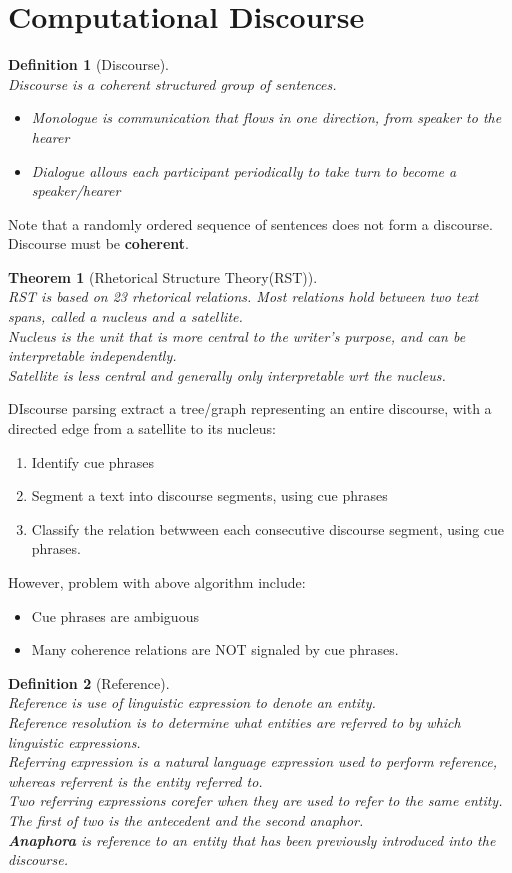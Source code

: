 \documentclass[12pt]{article}
\newtheorem{definition}{Definition}[section]
\newtheorem{theorem}{Theorem}[section]
\theoremstyle{definition}
\begin{document}
\section{Computational Discourse}
\begin{definition}[Discourse]
\hfill\\\normalfont Discourse is a coherent structured group of sentences.
\begin{itemize}
	\item Monologue is communication that flows in one direction, from speaker to the hearer
	\item Dialogue allows each participant periodically to take turn to become a speaker/hearer
\end{itemize}
\end{definition}
Note that a randomly ordered sequence of sentences does not form a discourse. Discourse must be \textbf{coherent}.
\begin{theorem}[Rhetorical Structure Theory(RST)]
\hfill\\\normalfont RST is based on 23 rhetorical relations. Most relations hold between two text spans, called a \textit{nucleus} and a \textit{satellite}.\\
Nucleus is the unit that is more central to the writer's purpose, and can be interpretable independently.\\
Satellite is less central and generally only interpretable wrt the nucleus.
\end{theorem}
DIscourse parsing extract a tree/graph representing an entire discourse, with a directed edge from a satellite to its nucleus:
\begin{enumerate}
	\item Identify cue phrases
	\item Segment a text into discourse segments, using cue phrases
	\item Classify the relation betwween each consecutive discourse segment, using cue phrases.
\end{enumerate}
However, problem with above algorithm include:
\begin{itemize}
	\item Cue phrases are ambiguous
	\item Many coherence relations are NOT signaled by cue phrases.
\end{itemize}
\begin{definition}[Reference]
\hfill\\\normalfont Reference is use of linguistic expression to denote an entity.\\
Reference resolution is to determine what entities are referred to by which linguistic expressions.\\
Referring expression is a natural language expression used to perform reference, whereas referrent is the entity referred to.\\
Two referring expressions \textit{corefer} when they are used to refer to the same entity. The first of two is the \textit{antecedent} and the second \textit{anaphor}.\\
\textbf{Anaphora} is reference to an entity that has been previously introduced into the discourse. 
\end{definition}
\end{document}
